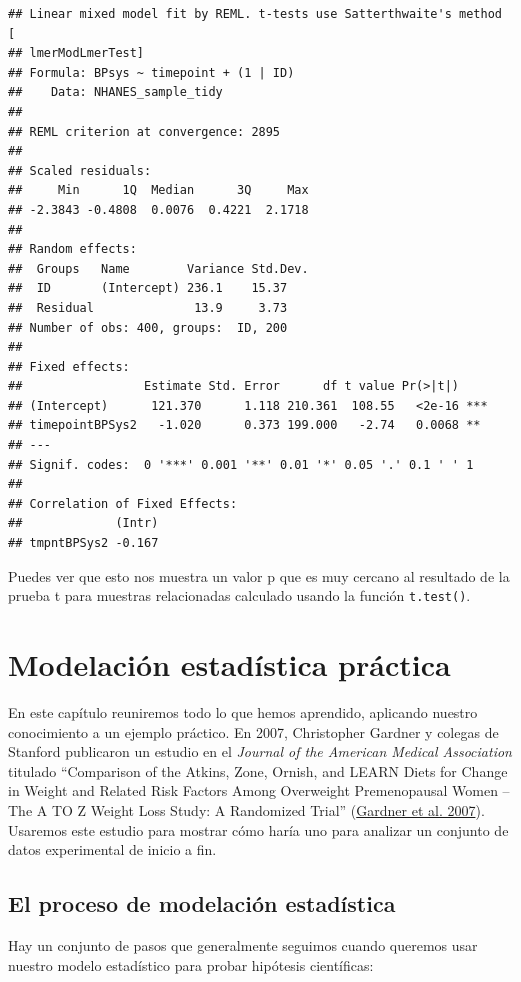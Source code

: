 \documentclass[
  12pt,
]{book}
\begin{document}
\begin{verbatim}
## Linear mixed model fit by REML. t-tests use Satterthwaite's method [
## lmerModLmerTest]
## Formula: BPsys ~ timepoint + (1 | ID)
##    Data: NHANES_sample_tidy
## 
## REML criterion at convergence: 2895
## 
## Scaled residuals: 
##     Min      1Q  Median      3Q     Max 
## -2.3843 -0.4808  0.0076  0.4221  2.1718 
## 
## Random effects:
##  Groups   Name        Variance Std.Dev.
##  ID       (Intercept) 236.1    15.37   
##  Residual              13.9     3.73   
## Number of obs: 400, groups:  ID, 200
## 
## Fixed effects:
##                 Estimate Std. Error      df t value Pr(>|t|)    
## (Intercept)      121.370      1.118 210.361  108.55   <2e-16 ***
## timepointBPSys2   -1.020      0.373 199.000   -2.74   0.0068 ** 
## ---
## Signif. codes:  0 '***' 0.001 '**' 0.01 '*' 0.05 '.' 0.1 ' ' 1
## 
## Correlation of Fixed Effects:
##             (Intr)
## tmpntBPSys2 -0.167
\end{verbatim}

Puedes ver que esto nos muestra un valor p que es muy cercano al resultado de la prueba t para muestras relacionadas calculado usando la función \texttt{t.test()}.

\hypertarget{practical-example}{%
\chapter{Modelación estadística práctica}\label{practical-example}}

En este capítulo reuniremos todo lo que hemos aprendido, aplicando nuestro conocimiento a un ejemplo práctico. En 2007, Christopher Gardner y colegas de Stanford publicaron un estudio en el \emph{Journal of the American Medical Association} titulado ``Comparison of the Atkins, Zone, Ornish, and LEARN Diets for Change in Weight and Related Risk Factors Among Overweight Premenopausal Women -- The A TO Z Weight Loss Study: A Randomized Trial'' (\protect\hyperlink{ref-gard:kiaz:alha:2007}{Gardner et al. 2007}). Usaremos este estudio para mostrar cómo haría uno para analizar un conjunto de datos experimental de inicio a fin.

\hypertarget{el-proceso-de-modelaciuxf3n-estaduxedstica}{%
\section{El proceso de modelación estadística}\label{el-proceso-de-modelaciuxf3n-estaduxedstica}}

Hay un conjunto de pasos que generalmente seguimos cuando queremos usar nuestro modelo estadístico para probar hipótesis científicas:
\end{document}
